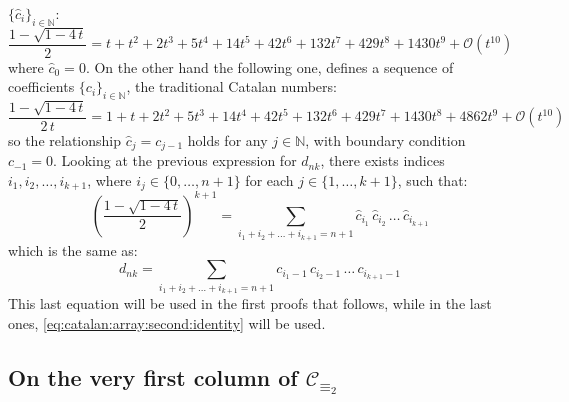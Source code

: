 $\lbrace \hat{c}_{i}\rbrace_{i\in\mathbb{N}}$:
\begin{displaymath}
    \frac{1-\sqrt{1-4\,t}}{2} = t + t^{2} + 2 t^{3} + 5 t^{4} 
        + 14 t^{5} + 42 t^{6} + 132 t^{7} + 429 t^{8} + 1430 t^{9} 
        + \mathcal{O}\left(t^{10}\right)
\end{displaymath}
where $\hat{c}_{0}=0$. On the other hand the following one, defines a sequence 
of coefficients $\lbrace c_{i}\rbrace_{i\in\mathbb{N}}$, 
the traditional Catalan numbers:
\begin{displaymath}
    \frac{1-\sqrt{1-4\,t}}{2\,t} = 1 + t + 2 t^{2} + 5 t^{3} + 14 t^{4} 
        + 42 t^{5} + 132 t^{6} + 429 t^{7} + 1430 t^{8} + 4862 t^{9} 
        + \mathcal{O}\left(t^{10}\right)
\end{displaymath}
so the relationship $\hat{c}_{j} = c_{j-1}$ holds for any $j\in\mathbb{N}$, 
with boundary condition $c_{-1}=0$.  Looking at the previous expression for $d_{nk}$,
there exists indices $i_{1}, i_{2}, \ldots, i_{k+1}$,
where $i_{j}\in\lbrace0,\ldots,n+1\rbrace$ for each $j\in\lbrace1,\ldots,k+1\rbrace$, 
such that:
\begin{displaymath}
    [t^{n+1}] \left(\frac{1-\sqrt{1-4\,t}}{2}\right)^{k+1} 
        = \sum_{i_{1}+ i_{2}+ \ldots+ i_{k+1}=n+1}{
            \hat{c}_{i_{1}}\,\hat{c}_{i_{2}}\,\ldots\,\hat{c}_{i_{k+1}} }
\end{displaymath}
which is the same as:
\begin{equation}
    d_{nk} = \sum_{i_{1}+ i_{2}+ \ldots+ i_{k+1}=n+1}{
            c_{i_{1}-1}\,c_{i_{2}-1}\,\ldots\,c_{i_{k+1}-1} }
    \label{eq:convolution:expansion:for:generic:element:in:catalan:array}
\end{equation}
This last equation will be used in the first proofs that follows, while
in the last ones, \autoref{eq:catalan:array:second:identity} will be used.


\subsection{On the very first column of $\mathcal{C}_{\equiv_{2}}$}


